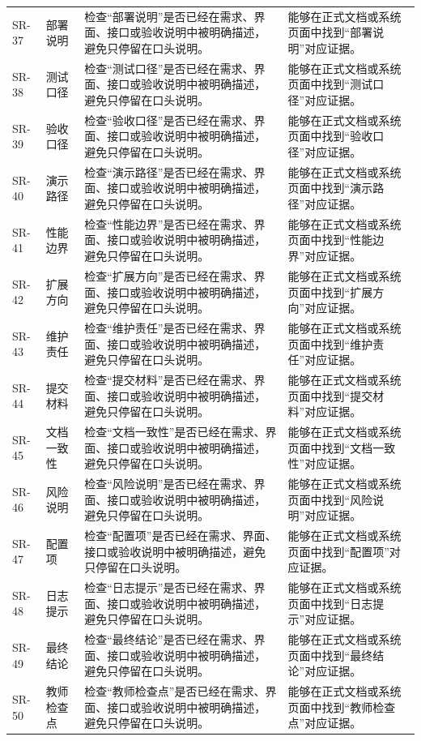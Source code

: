 \documentclass[12pt,a4paper]{ctexart}
\begin{document}
\begin{longtable}{L{1.7cm}L{3.0cm}L{6.2cm}L{4.4cm}}
SR-37 & 部署说明 & 检查“部署说明”是否已经在需求、界面、接口或验收说明中被明确描述，避免只停留在口头说明。 & 能够在正式文档或系统页面中找到“部署说明”对应证据。 \\
SR-38 & 测试口径 & 检查“测试口径”是否已经在需求、界面、接口或验收说明中被明确描述，避免只停留在口头说明。 & 能够在正式文档或系统页面中找到“测试口径”对应证据。 \\
SR-39 & 验收口径 & 检查“验收口径”是否已经在需求、界面、接口或验收说明中被明确描述，避免只停留在口头说明。 & 能够在正式文档或系统页面中找到“验收口径”对应证据。 \\
SR-40 & 演示路径 & 检查“演示路径”是否已经在需求、界面、接口或验收说明中被明确描述，避免只停留在口头说明。 & 能够在正式文档或系统页面中找到“演示路径”对应证据。 \\
SR-41 & 性能边界 & 检查“性能边界”是否已经在需求、界面、接口或验收说明中被明确描述，避免只停留在口头说明。 & 能够在正式文档或系统页面中找到“性能边界”对应证据。 \\
SR-42 & 扩展方向 & 检查“扩展方向”是否已经在需求、界面、接口或验收说明中被明确描述，避免只停留在口头说明。 & 能够在正式文档或系统页面中找到“扩展方向”对应证据。 \\
SR-43 & 维护责任 & 检查“维护责任”是否已经在需求、界面、接口或验收说明中被明确描述，避免只停留在口头说明。 & 能够在正式文档或系统页面中找到“维护责任”对应证据。 \\
SR-44 & 提交材料 & 检查“提交材料”是否已经在需求、界面、接口或验收说明中被明确描述，避免只停留在口头说明。 & 能够在正式文档或系统页面中找到“提交材料”对应证据。 \\
SR-45 & 文档一致性 & 检查“文档一致性”是否已经在需求、界面、接口或验收说明中被明确描述，避免只停留在口头说明。 & 能够在正式文档或系统页面中找到“文档一致性”对应证据。 \\
SR-46 & 风险说明 & 检查“风险说明”是否已经在需求、界面、接口或验收说明中被明确描述，避免只停留在口头说明。 & 能够在正式文档或系统页面中找到“风险说明”对应证据。 \\
SR-47 & 配置项 & 检查“配置项”是否已经在需求、界面、接口或验收说明中被明确描述，避免只停留在口头说明。 & 能够在正式文档或系统页面中找到“配置项”对应证据。 \\
SR-48 & 日志提示 & 检查“日志提示”是否已经在需求、界面、接口或验收说明中被明确描述，避免只停留在口头说明。 & 能够在正式文档或系统页面中找到“日志提示”对应证据。 \\
SR-49 & 最终结论 & 检查“最终结论”是否已经在需求、界面、接口或验收说明中被明确描述，避免只停留在口头说明。 & 能够在正式文档或系统页面中找到“最终结论”对应证据。 \\
SR-50 & 教师检查点 & 检查“教师检查点”是否已经在需求、界面、接口或验收说明中被明确描述，避免只停留在口头说明。 & 能够在正式文档或系统页面中找到“教师检查点”对应证据。 \\
\bottomrule
\end{longtable}
\end{document}
